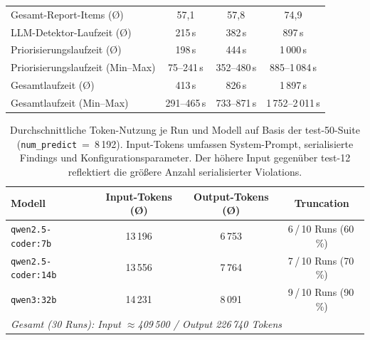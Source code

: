 \begin{table}[htbp]
{\begin{tabular}{|l|c|c|c|}
Gesamt-Report-Items (Ø)           & 57{,}1           & 57{,}8              & 74{,}9 \\
\ac{LLM}-Detektor-Laufzeit (Ø)         & 215\,s           & 382\,s              & 897\,s \\
Priorisierungslaufzeit (Ø)        & 198\,s           & 444\,s              & 1\,000\,s \\
Priorisierungslaufzeit (Min--Max) & 75--241\,s       & 352--480\,s         & 885--1\,084\,s \\
Gesamtlaufzeit (Ø)                & 413\,s           & 826\,s              & 1\,897\,s \\
Gesamtlaufzeit (Min--Max)         & 291--465\,s      & 733--871\,s         & 1\,752--2\,011\,s \\
\hline
\end{tabular}
}%
\label{tab:modell_summary_50}
\end{table}

\clearpage

\label{app:token_economy_50}

\begin{table}[htbp]
\centering
\setlength{\tabcolsep}{4pt}
\renewcommand{\arraystretch}{1.2}
\caption[Token-Nutzung pro Modell (test-50)]{Durchschnittliche Token-Nutzung je Run und Modell auf Basis der test-50-Suite (\texttt{num\_predict}~=~8\,192). Input-Tokens umfassen System-Prompt, serialisierte Findings und Konfigurationsparameter. Der höhere Input gegenüber test-12 reflektiert die größere Anzahl serialisierter Violations.}
\begin{tabular}{|l|c|c|c|}
\hline
\textbf{Modell} & \textbf{Input-Tokens (Ø)} & \textbf{Output-Tokens (Ø)} & \textbf{Truncation} \\
\hline
\texttt{qwen2.5-coder:7b} & 13\,196 & 6\,753 & 6\,/\,10 Runs (60\,\%) \\
\hline
\texttt{qwen2.5-coder:14b} & 13\,556 & 7\,764 & 7\,/\,10 Runs (70\,\%) \\
\hline
\texttt{qwen3:32b} & 14\,231 & 8\,091 & 9\,/\,10 Runs (90\,\%) \\
\hline
\multicolumn{4}{|l|}{\textit{Gesamt (30 Runs): Input $\approx$409\,500 / Output 226\,740 Tokens}} \\
\hline
\end{tabular}
\label{tab:token_economy_50}
\end{table}

\label{app:effizienz_metriken_50}

